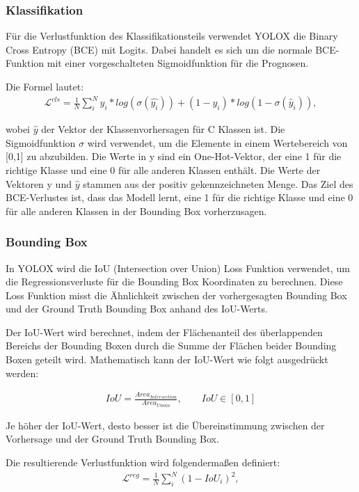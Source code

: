 \subsubsection{Klassifikation}\label{chap:yoloxClassification}
Für die Verlustfunktion des Klassifikationsteils verwendet YOLOX die Binary Cross Entropy (BCE) mit Logits. Dabei handelt es sich um die normale BCE-Funktion mit einer vorgeschalteten Sigmoidfunktion für die Prognosen.

Die Formel lautet:
\begin{align}
	\mathcal{L}^{cls}=\frac{1}{N}\sum_{i}^{N}y_i*log(\sigma(\hat{y_i}))+(1-y_i)*log(1-\sigma(\hat{y}_i)),
\end{align}

wobei $\hat{y}$ der Vektor der Klassenvorhersagen für C Klassen ist. Die Sigmoidfunktion $\sigma$ wird verwendet, um die Elemente in einem Wertebereich von [0,1] zu abzubilden. Die Werte in y sind ein One-Hot-Vektor, der eine 1 für die richtige Klasse und eine 0 für alle anderen Klassen enthält. Die Werte der Vektoren y und $\hat{y}$ stammen aus der positiv gekennzeichneten Menge. Das Ziel des BCE-Verlustes ist, dass das Modell lernt, eine 1 für die richtige Klasse und eine 0 für alle anderen Klassen in der Bounding Box vorherzusagen. \cite{yoloxExplanationHowWorks}

\subsubsection{Bounding Box}
In YOLOX wird die IoU (Intersection over Union) Loss Funktion verwendet, um die Regressionsverluste für die Bounding Box Koordinaten zu berechnen. Diese Loss Funktion misst die Ähnlichkeit zwischen der vorhergesagten Bounding Box und der Ground Truth Bounding Box anhand des IoU-Werts.

Der IoU-Wert wird berechnet, indem der Flächenanteil des überlappenden Bereichs der Bounding Boxen durch die Summe der Flächen beider Bounding Boxen geteilt wird. Mathematisch kann der IoU-Wert wie folgt ausgedrückt werden:

\begin{align}
	IoU = \frac{Area_{Intersection}}{Area_{Unoin}}, \qquad IoU \in [0,1]
\end{align}

Je höher der IoU-Wert, desto besser ist die Übereinstimmung zwischen der Vorhersage und der Ground Truth Bounding Box.

Die resultierende Verlustfunktion wird folgendermaßen definiert:
\begin{align}
	\mathcal{L}^{reg} = \frac{1}{N}\sum_{i}^{N}(1-IoU_i)^2,
\end{align}

